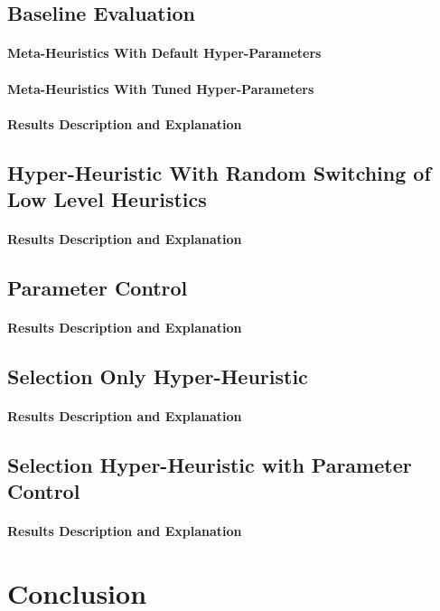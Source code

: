 \subsection{Baseline Evaluation}

\paragraph{Meta-Heuristics With Default Hyper-Parameters}

\paragraph{Meta-Heuristics With Tuned Hyper-Parameters}

\paragraph{Results Description and Explanation}


\subsection{Hyper-Heuristic With Random Switching of Low Level Heuristics}

\paragraph{Results Description and Explanation}


\subsection{Parameter Control}

\paragraph{Results Description and Explanation}


\subsection{Selection Only Hyper-Heuristic}

\paragraph{Results Description and Explanation}


\subsection{Selection Hyper-Heuristic with Parameter Control}

\paragraph{Results Description and Explanation}

\section{Conclusion}
